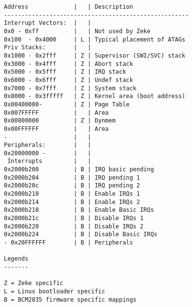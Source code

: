 \begin{table}
\caption{The memory map of Zeke running on BCM2835.}
\label{table:bcm_memmap}
\begin{verbatim}
Address             |   | Description
-----------------------------------------------------
Interrupt Vectors:  |   |
0x0 - 0xff          |   | Not used by Zeke
0x100  - 0x4000     | L | Typical placement of ATAGs
Priv Stacks:        |   |
0x1000 - 0x2fff     | Z | Supervisor (SWI/SVC) stack
0x3000 - 0x4fff     | Z | Abort stack
0x5000 - 0x5fff     | Z | IRQ stack
0x6000 - 0x6fff     | Z | Undef stack
0x7000 - 0x7fff     | Z | System stack
0x8000 - 0x3fffff   | Z | Kernel area (boot address)
0x00400000-         | Z | Page Table
0x007FFFFF          |   | Area
0x00800000          | Z | Dynmem
0x00FFFFFF          |   | Area
-                   |   |
Peripherals:        |   |
0x20000000 -        |   |
 Interrupts         |   |
0x2000b200          | B | IRQ basic pending
0x2000b204          | B | IRQ pending 1
0x2000b20c          | B | IRQ pending 2
0x2000b210          | B | Enable IRQs 1
0x2000b214          | B | Enable IRQs 2
0x2000b218          | B | Enable Basic IRQs
0x2000b21c          | B | Disable IRQs 1
0x2000b220          | B | Disable IRQs 2
0x2000b224          | B | Disable Basic IRQs
- 0x20FFFFFF        | B | Peripherals

Legends
-------

Z = Zeke specific
L = Linux bootloader specific
B = BCM2835 firmware specific mappings
\end{verbatim}
\end{table}







